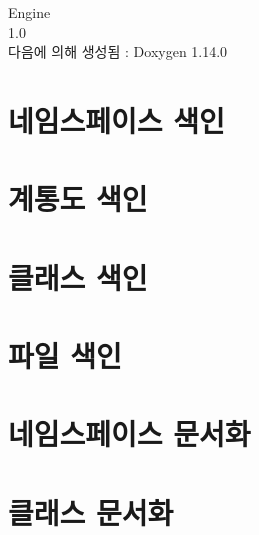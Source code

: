\documentclass[twoside]{book}
\newcommand{\+}{\discretionary{\mbox{\scriptsize$\hookleftarrow$}}{}{}}
\newcommand{\clearemptydoublepage}{%
    \newpage{\pagestyle{empty}\cleardoublepage}%
  }
\begin{document}
  \raggedbottom
    \hypersetup{pageanchor=false,
                bookmarksnumbered=true,
                pdfencoding=unicode
               }
  \begin{titlepage}
  \vspace*{7cm}
  \begin{center}%
  {\Large Engine}\\
  [1ex]\large 1.\+0 \\
  \vspace*{1cm}
  {\large 다음에 의해 생성됨 \+:  Doxygen 1.14.0}\\
  \end{center}
  \end{titlepage}
  \clearemptydoublepage
  \tableofcontents
  \clearemptydoublepage
  \hypersetup{pageanchor=true}
\chapter{네임스페이스 색인}

\chapter{계통도 색인}

\chapter{클래스 색인}

\chapter{파일 색인}

\chapter{네임스페이스 문서화}

\chapter{클래스 문서화}








































\end{document}
